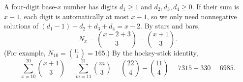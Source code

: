 A four-digit base-$x$ number has digits $d_1\ge1$ and $d_2,d_3,d_4\ge0$. If their sum is $x-1$, each digit is automatically at most $x-1$, so we only need nonnegative solutions of $(d_1-1)+d_2+d_3+d_4=x-2$. By stars and bars,
\[N_x=\binom{x-2+3}{3}=\binom{x+1}{3}.\]
(For example, $N_{10}=\binom{11}3=165$.) By the hockey-stick identity,
\[\sum_{x=10}^{20}\binom{x+1}3=\sum_{m=11}^{21}\binom m3=\binom{22}4-\binom{11}4=7315-330=\boxed{6985}.\]
